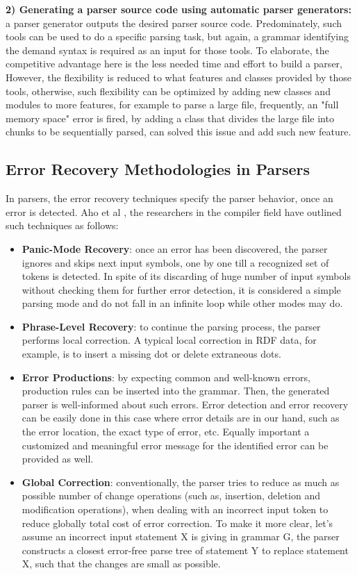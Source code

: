\textbf{2) Generating a parser source code using automatic parser generators:} a parser generator outputs the desired parser source code. Predominately, such tools can be used to do a specific parsing task, but again, a grammar identifying the  demand syntax is required as an input for those tools. To elaborate, the competitive advantage here is the less needed time and effort to build a parser, However, the flexibility is reduced to what features and classes provided by those tools, otherwise, such flexibility can be  optimized by adding new classes and modules to more features, for example to parse a large file, frequently, an "full memory space" error is fired, by adding a class that divides the large file into chunks to be sequentially parsed, can solved this issue and add such new feature.  

\subsection{Error Recovery Methodologies in Parsers}
In parsers, the error recovery techniques specify the parser behavior, once an error is detected.  Aho et al \cite{Aho:2006}, the researchers in the compiler field    have outlined such techniques as follows:
\begin{itemize}
	\item \textbf{Panic-Mode Recovery}: once an error has been discovered, the parser ignores and skips next input symbols, one by one till a recognized set of tokens is detected. In spite of its discarding of huge number of input symbols without checking them for further error detection, it is considered a simple parsing mode and do not fall in an infinite loop while other modes may do.
	\item \textbf{Phrase-Level Recovery}: to continue the parsing process, the parser performs local correction. A typical local correction in RDF data, for example, is to insert a missing dot or delete extraneous dots.
	\item \textbf{Error Productions}: by expecting  common and well-known errors, production rules can be inserted into the grammar. Then, the generated parser is well-informed about such errors. Error detection and error recovery can be easily done in this case where error details are in our hand, such as the error location, the exact type of error, etc. Equally important a customized and meaningful error message for the identified error can be provided as well. 
	\item \textbf{Global Correction}: conventionally, the parser tries to reduce as much as possible number of change operations (such as, insertion, deletion and modification operations), when dealing with an incorrect input token to reduce globally total cost of error correction. To make it more clear, let's assume an incorrect input statement X is giving in grammar G, the parser constructs a closest error-free parse tree of statement Y to replace statement X, such that the changes are small as possible. 
\end{itemize}


